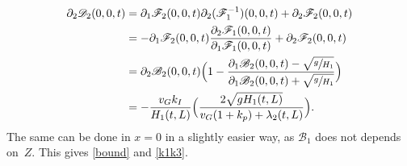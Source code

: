 \documentclass[JEP,XML,SOM,Unicode]{cedram}
\let\mathcal\mathscr
\theoremstyle{definition}
\begin{document}
\begin{equation*}
\begin{split}
\partial_{2}\mathcal{D}_{2}(0,0,t)&=\partial_{1}\mathcal{F}_{2}(0,0,t)\partial_{2}(\mathcal{F}_{1}^{-1})(0,0,t)+\partial_{2}\mathcal{F}_{2}(0,0,t)\\
&=-\partial_{1}\mathcal{F}_{2}(0,0,t)\frac{\partial_{2}\mathcal{F}_{1}(0,0,t)}{\partial_{1}\mathcal{F}_{1}(0,0,t)}+\partial_{2}\mathcal{F}_{2}(0,0,t)\\
&=\partial_{2}\mathcal{B}_{2}(0,0,t)\Bigl(1-\frac{\partial_{1}\mathcal{B}_{2}(0,0,t)-\sqrt{\sfrac{g}{H_{1}}}}{\partial_{1}\mathcal{B}_{2}(0,0,t)+\sqrt{\sfrac{g}{H_{1}}}}\Bigr)\\
&=-\frac{v_{G}k_{I}}{H_{1}(t,L)} \Bigl(\frac{2\sqrt{gH_{1}(t,L)}}{v_{G}(1+k_{p})+\lambda_{2}(t,L)} \Bigr).
\end{split}
\end{equation*}
The same can be done in $x=0$ in a slightly easier way, as $\mathcal{B}_{1}$ does not depends on~$Z$. This gives \eqref{bound} and \eqref{k1k3}.
\end{document}

